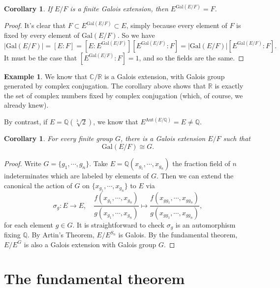 \documentclass[12pt]{report}
\newtheorem{corollary}[theorem]{Corollary}
\theoremstyle{definition}
\newtheorem{example}[theorem]{Example}
\newcommand{\Aut}{\text{Aut}}
\newcommand{\Gal}{\text{Gal}}
\newcommand{\CC}{\mathbb{C}}
\newcommand{\QQ}{\mathbb{Q}}
\newcommand{\RR}{\mathbb{R}}
\begin{document}
\begin{corollary}\label{artincor}
	If $E/F$ is a finite Galois extension, then $E^{\Gal(E/F)} = F$.
\end{corollary}

\begin{proof}
	It's clear that $F \subset E^{\Gal(E/F)}\subset E$, simply because every element of $F$ is fixed by every element of $\Gal(E/F)$. So we have $$|\Gal(E/F)|=[E : F] = [E : E^{\Gal(E/F)}][E^{\Gal(E/F)} : F] =|\Gal(E/F)|[E^{\Gal(E/F)} : F].$$
	It must be the case that $[E^{\Gal(E/F)} : F] = 1$, and so the fields are the same.
\end{proof}

\begin{example}
	We know that $\CC/\RR$ is a Galois extension, with Galois group generated by complex conjugation. The corollary above shows that $\RR$ is exactly the set of complex numbers fixed by complex conjugation (which, of course, we already knew).

	By contrast, if $E =\QQ(\sqrt[3]{2})$, we know that $E^{\Aut(E/\QQ)} = E \not= \QQ$.
\end{example}


\begin{corollary}
	For every finite group $G$, there is a Galois extension $E/F$ such that $$\Gal(E/F) \cong G.$$
\end{corollary}

\begin{proof}
	Write $G=\{g_1,\cdots,g_n\}$. Take $E=\QQ(x_{g_1},\cdots,x_{g_n})$ the fraction field of $n$ indeterminates which are labeled by elements of $G$. Then we can extend the canonical the action of $G$ on $\{x_{g_1},\cdots,x_{g_n}\}$ to $E$ via $$\sigma_g: E\to E,\quad  \frac{f(x_{g_1},\cdots,x_{g_n})}{g(x_{g_1},\cdots,x_{g_n})}\mapsto  \frac{f(x_{gg_1},\cdots,x_{gg_n})}{g(x_{gg_1},\cdots,x_{gg_n})},$$ for each element $g\in G$. It is straightforward to check $\sigma_g$ is an automorphism fixing $\QQ$. By Artin's Theorem, $E/E^{S_n}$ is Galois. By the fundamental theorem, $E/E^G$ is also a Galois extension with Galois group $G$.
\end{proof}


\section{The fundamental theorem}
\end{document}
